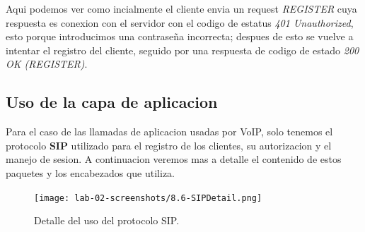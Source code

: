 \documentclass[10pt]{article}
\begin{document}
Aqui podemos ver como incialmente el cliente envia un request \textit{REGISTER} cuya respuesta es conexion con el servidor con el codigo de estatus \textit{401 Unauthorized}, esto porque introducimos una contraseña incorrecta; despues de esto se vuelve a intentar el registro del cliente, seguido por una respuesta de codigo de estado \textit{200 OK (REGISTER)}.
\subsection*{Uso de la capa de aplicacion}
Para el caso de las llamadas de aplicacion usadas por VoIP, solo tenemos el protocolo \textbf{SIP} utilizado para el registro de los clientes, su autorizacion y el manejo de sesion. A continuacion veremos mas a detalle el contenido de estos paquetes y los encabezados que utiliza.

\begin{figure}[H]
    \centering
    \texttt{[image: lab-02-screenshots/8.6-SIPDetail.png]}
    \caption{Detalle del uso del protocolo SIP.}
\end{figure}
\end{document}
